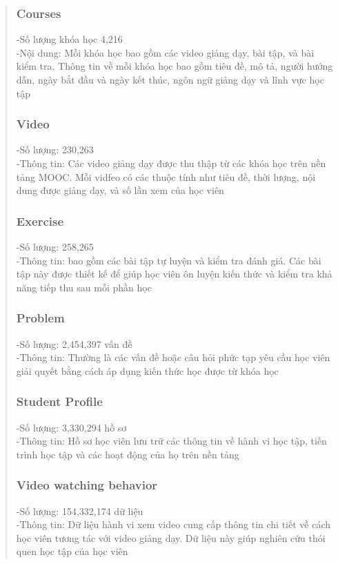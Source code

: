 \begin{quote}
\subsubsection{Courses}
-Số lượng khóa học 4,216\\
-Nội dung: Mỗi khóa học bao gồm các video giảng dạy, bài tập, và bài kiểm tra. Thông tin về mỗi khóa học bao gồm tiêu đề, mô tả, người hướng dẫn, ngày bắt đầu và ngày kết thúc, ngôn ngữ giảng dạy và lĩnh vực học tập\\
\subsubsection{Video}
-Số lượng: 230,263\\
-Thông tin: Các video giảng dạy được thu thập từ các khóa học trên nền tảng MOOC. Mỗi vidfeo có các thuộc tính như tiêu đề, thời lượng, nội dung được giảng dạy, và số lần xem của học viên\\
\subsubsection{Exercise }
-Số lượng: 258,265\\
-Thông tin: bao gồm các bài tập tự luyện và kiểm tra đánh giá. Các bài tập này được thiết kế để giúp học viên ôn luyện kiến thức và kiểm tra khả năng tiếp thu sau mỗi phần học\\
\subsubsection{Problem}
-Số lượng: 2,454,397 vấn đề\\
-Thông tin: Thường là các vấn đề hoặc câu hỏi phức tạp yêu cầu học viên giải quyết bằng cách áp dụng kiến thức học được từ khóa học\\
\subsubsection{Student Profile}
-Số lượng: 3,330,294 hồ sơ\\
-Thông tin: Hồ sơ học viên lưu trữ các thông tin về hành vi học tập, tiến trình học tập và các hoạt động của họ trên nền tảng\\
\subsubsection{Video watching behavior}
-Số lượng: 154,332,174 dữ liệu\\
-Thông tin: Dữ liệu hành vi xem video cung cấp thông tin chi tiết về cách học viên tương tác với video giảng dạy. Dữ liệu này giúp nghiên cứu thói quen học tập của học viên\\

\end{quote}
